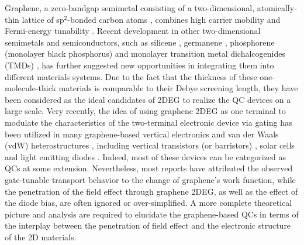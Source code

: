 \documentclass[journal=nalefd]{achemso}
\newcommand*\change[1]{{#1}}
\begin{document}
Graphene, a zero-bandgap semimetal consisting of a two-dimensional, atomically-thin lattice of sp$^2$-bonded carbon atoms \cite{Novoselov2004Electric}, combines high carrier mobility \cite{Mayorov2011MicrometerScale} and Fermi-energy tunability \cite{Zhang2005Experimental, Das2008Monitoring, Yu2009Tuning}. 
Recent development in other two-dimensional semimetals and semiconductors, such as silicene \cite{Aufray2010silicene}, germanene \cite{Davila2014germanene}, 
\change{
  phosphorene (monolayer black phosphorus) \cite{Li2014Phosphorene,Liu2014Phosphorene}
}
and monolayer transition metal dichalcogenides (TMDs) \cite{wang2012electronics}, has further suggested new opportunities in integrating them into different materials systems.
Due to the fact that the thickness of these one-molecule-thick materials is comparable to their Debye screening length, 
they have been considered as the ideal candidates of 2DEG \cite{novoselov2012roadmap} to realize the QC devices on a large scale. 
Very recently, the idea of using graphene 2DEG as one terminal to modulate the characteristics of the two-terminal 
electronic device via gating has been utilized in many graphene-based vertical electronics and 
van der Waals (vdW) heterostructures \cite{geim2013van},
including vertical transistors 
(or barristors) \cite{Yang2012Graphene, yu2013vertically, georgiou2013vertical, Shih2015PartiallyScreened}, solar cells \cite{yu2013highly, britnell2013strong, Regan2012ScreeningEngineered} and light emitting diodes \cite{withers2015light}.
Indeed, most of these devices can be categorized as QCs at some extension.
Nevertheless, most reports have attributed the observed gate-tunable transport 
behavior to the change of graphene's work function, while the penetration of the 
field effect through graphene 2DEG, as well as the effect of the diode bias, are often ignored or over-simplified.
A more complete theoretical picture and analysis are required to elucidate the graphene-based QCs in terms of 
the interplay between the penetration of field effect and the electronic structure of the 2D materials. 
\end{document}
